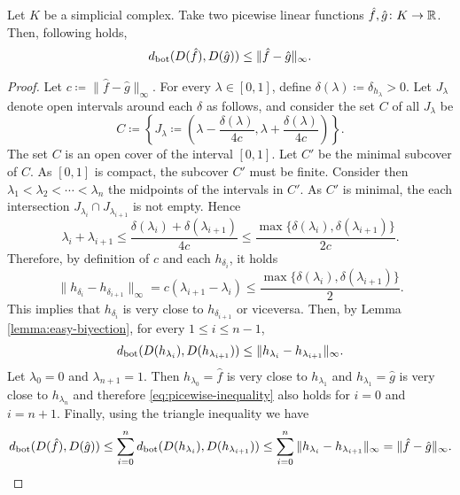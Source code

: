 \begin{lemma} \label{lemma:interpolation}
    Let $ K $ be a simplicial complex. Take two picewise linear functions $ \hat f, \hat g \colon K \to \mathbb R $. Then, following holds,
    \begin{align}
        d_{\operatorname{bot}}(D(\hat f), D(\hat g)) \leq \|\hat f - \hat g \|_\infty.
    \end{align}
\end{lemma}
\begin{proof}
    Let $ c \coloneq \| \hat f - \hat g \|_\infty $. For every $ \lambda \in [0, 1] $, define $ \delta(\lambda) \coloneq \delta_{h_\lambda} > 0 $. Let $ J_\lambda $ denote open intervals around each $ \delta $ as follows, and consider the set $ C $ of all $ J_\lambda $ be
    $$
        C \coloneq \left\{J_\lambda \coloneq\left( \lambda - \frac{\delta(\lambda)}{4c}, \lambda + \frac{\delta(\lambda)}{4c}\right)\right\}.
    $$
    The set $ C $ is an open cover of the interval $ [0, 1] $. Let $ C'$ be the minimal subcover of $ C $. As $ [0, 1] $ is compact, the subcover $ C' $ must be finite. Consider then $ \lambda_1 < \lambda_2 < \cdots < \lambda_n $ the midpoints of the intervals in $ C' $. As $ C' $ is minimal, the each intersection $ J_{\lambda_i} \cap J_{\lambda_{i+1}} $ is not empty. Hence
    $$
        \lambda_i + \lambda_{i+1} \leq \frac{\delta(\lambda_i) + \delta(\lambda_{i+1})}{4c} \leq \frac{\max\{\delta(\lambda_i), \delta(\lambda_{i+1})\}}{2c}.
    $$
    Therefore, by definition of $ c $ and each $ h_{\delta_i} $, it holds
    $$
        \|h_{\delta_i} - h_{\delta_{i+1}} \|_\infty = c(\lambda_{i+1} - \lambda_i) \leq \frac{\max\{\delta(\lambda_i), \delta(\lambda_{i+1})\}}{2}.
    $$
    This implies that $ h_{\delta_i} $ is very close to $ h_{\delta_{i+1}} $ or viceversa. Then, by Lemma \ref{lemma:easy-biyection}, for every $ 1 \leq i \leq n-1 $,
    \begin{align} \label{eq:picewise-inequality}
        d_{\operatorname{bot}}(D(h_{\lambda_i}), D(h_{\lambda_{i+1}})) \leq \| h_{\lambda_i} - h_{\lambda_{i+1}} \|_\infty.
    \end{align}
    Let $ \lambda_0 = 0 $ and $ \lambda_{n+1} = 1 $. Then $ h_{\lambda_0} = \hat f $ is very close to $ h_{\lambda_1} $ and $ h_{\lambda_1} = \hat g $ is very close to $ h_{\lambda_n} $ and therefore \eqref{eq:picewise-inequality} also holds for $ i = 0 $ and $ i = n+1 $. Finally, using the triangle inequality we have
    $$
        d_{\operatorname{bot}}(D(\hat f), D(\hat g)) \leq \sum_{i=0}^{n} d_{\operatorname{bot}}(D(h_{\lambda_i}), D(h_{\lambda_{i+1}})) \leq \sum_{i=0}^{n} \| h_{\lambda_i} - h_{\lambda_{i+1}} \|_\infty = \|\hat f - \hat g \|_\infty.
    $$
\end{proof}

